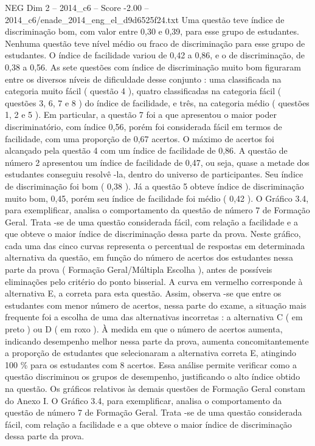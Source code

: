 \begin{textsample}{NEG Dim 2 – 2014\_c6 – Score -2.00 – 2014\_c6/enade\_2014\_eng\_el\_d9d6525f24.txt}
Uma questão teve índice de discriminação bom, com valor entre 0,30 e 0,39, para esse grupo de estudantes.
Nenhuma questão teve nível médio ou fraco de discriminação para esse grupo de estudantes.
O índice de facilidade variou de 0,42 a 0,86, e o de discriminação, de 0,38 a 0,56.
As sete questões com índice de discriminação muito bom figuraram entre os diversos níveis de dificuldade desse conjunto : uma classificada na categoria muito fácil ( questão 4 ), quatro classificadas na categoria fácil ( questões 3, 6, 7 e 8 ) do índice de facilidade, e três, na categoria médio ( questões 1, 2 e 5 ).
Em particular, a questão 7 foi a que apresentou o maior poder discriminatório, com índice 0,56, porém foi considerada fácil em termos de facilidade, com uma proporção de 0,67 acertos.
O máximo de acertos foi alcançado pela questão 4 com um índice de facilidade de 0,86.
A questão de número 2 apresentou um índice de facilidade de 0,47, ou seja, quase a metade dos estudantes conseguiu resolvê -la, dentro do universo de participantes.
Seu índice de discriminação foi bom ( 0,38 ).
Já a questão 5 obteve índice de discriminação muito bom, 0,45, porém seu índice de facilidade foi médio ( 0,42 ).
O Gráfico 3.4, para exemplificar, analisa o comportamento da questão de número 7 de Formação Geral.
Trata -se de uma questão considerada fácil, com relação a facilidade e a que obteve o maior índice de discriminação dessa parte da prova.
Neste gráfico, cada uma das cinco curvas representa o percentual de respostas em determinada alternativa da questão, em função do número de acertos dos estudantes nessa parte da prova ( Formação Geral/Múltipla Escolha ), antes de possíveis eliminações pelo critério do ponto bisserial.
A curva em vermelho corresponde à alternativa E, a correta para esta questão.
Assim, observa -se que entre os estudantes com menor número de acertos, nessa parte do exame, a situação mais frequente foi a escolha de uma das alternativas incorretas : a alternativa C ( em preto ) ou D ( em roxo ).
À medida em que o número de acertos aumenta, indicando desempenho melhor nessa parte da prova, aumenta concomitantemente a proporção de estudantes que selecionaram a alternativa correta E, atingindo 100 \% para os estudantes com 8 acertos.
Essa análise permite verificar como a questão discriminou os grupos de desempenho, justificando o alto índice obtido na questão.
Os gráficos relativos às demais questões de Formação Geral constam do Anexo I.
O Gráfico 3.4, para exemplificar, analisa o comportamento da questão de número 7 de Formação Geral.
Trata -se de uma questão considerada fácil, com relação a facilidade e a que obteve o maior índice de discriminação dessa parte da prova.

\end{textsample}

